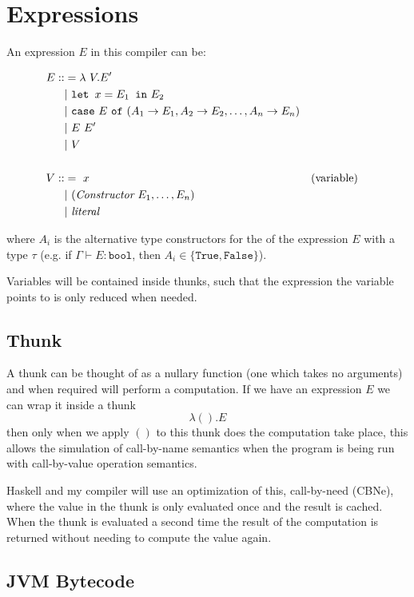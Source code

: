 \documentclass[12pt,a4paper,twoside]{article}
\begin{document}
\section{Expressions}

An expression $E$ in this compiler can be:

\begin{align*}
E ::&= \lambda\ V . E' \\
   &|\ \texttt{let } x = E_1 \texttt{ in} \ E_2\\ 
   &|\ \texttt{case}\ E \ \texttt{of} \ (A_1 \rightarrow E_1, A_2 \rightarrow E_2, \mathellipsis, A_n \rightarrow E_n)\\
   &|\ E\ E'\\
   &|\ V\\\\
V ::&=\ x &&\text{(variable)}\\
   &|\ (\textit{Constructor}\ E_1, \mathellipsis, E_n )\\
   &|\ \textit{literal}
\end{align*}

where $A_i$ is the alternative type constructors for the of the expression $E$ with a type $\tau$
(e.g. if $\Gamma \vdash E : \texttt{bool}$, then $A_i \in \{ \texttt{True},  \texttt{False} \}$).


Variables will be contained inside thunks, such that the expression the variable points to is only reduced 
when needed.

\subsection{Thunk}

A thunk can be thought of as a nullary function (one which takes no arguments) and when required will 
perform a computation. If we have an expression $E$ we can wrap it inside a thunk \[ \lambda (). E \] then 
only when we apply $()$ to this thunk does the computation take place, this allows the
simulation of call-by-name semantics
when the program is being run with call-by-value operation semantics. 

Haskell and my compiler will use an optimization of this, call-by-need (CBNe), where the value in the thunk is only evaluated once and the 
result is cached. When the thunk is evaluated a second time the result of the computation is returned without needing to compute the value again.


\subsection{JVM Bytecode}
\end{document}
